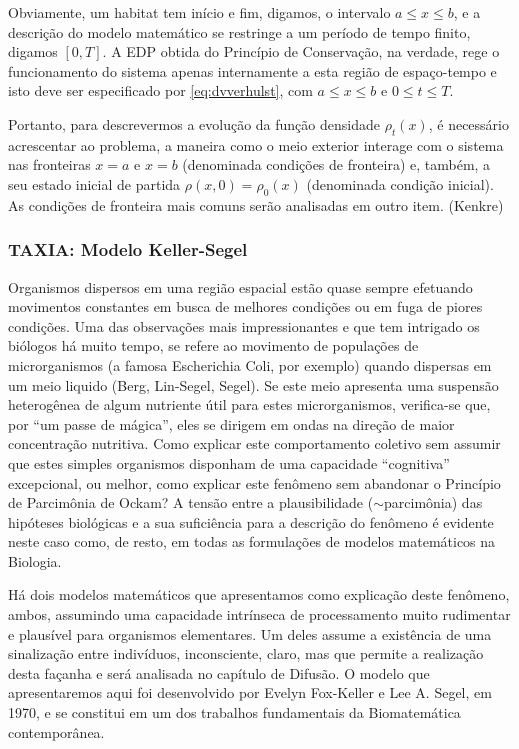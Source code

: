 Obviamente, um habitat tem início e fim, digamos, o intervalo \(a \le x \le b\), e a descrição do modelo matemático se restringe a um período de tempo finito, digamos \([0, T]\). A EDP obtida do Princípio de Conservação, na verdade, rege o funcionamento do sistema apenas internamente a esta região de espaço-tempo e isto deve ser especificado por \eqref{eq:dvverhulst}, com \(a \le x \le b\) e \(0 \le t \le T\).

Portanto, para descrevermos a evolução da função densidade \(\rho_t(x)\), é necessário acrescentar ao problema, a maneira como o meio exterior interage com o sistema nas fronteiras \(x = a\) e \(x = b\) (denominada condições de fronteira) e, também, a seu estado inicial de partida \(\rho(x, 0) = \rho_0(x)\) (denominada condição inicial). As condições de fronteira mais comuns serão analisadas em outro item. (Kenkre)

\subsubsection{TAXIA: Modelo Keller-Segel}

Organismos dispersos em uma região espacial estão quase sempre efetuando movimentos constantes em busca de melhores condições ou em fuga de piores condições. Uma das observações mais impressionantes e que tem intrigado os biólogos há muito tempo, se refere ao movimento de populações de microrganismos (a famosa Escherichia Coli, por exemplo) quando dispersas em um meio liquido (Berg, Lin-Segel, Segel). Se este meio apresenta uma suspensão heterogênea de algum nutriente útil para estes microrganismos, verifica-se que, por ``um passe de mágica'', eles se dirigem em ondas na direção de maior concentração nutritiva. Como explicar este comportamento coletivo sem assumir que estes simples organismos disponham de uma capacidade ``cognitiva'' excepcional, ou melhor, como explicar este fenômeno sem abandonar o Princípio de Parcimônia de Ockam? A tensão entre a plausibilidade (\(\sim\)parcimônia) das hipóteses biológicas e a sua suficiência para a descrição do fenômeno é evidente neste caso como, de resto, em todas as formulações de modelos matemáticos na Biologia.

Há dois modelos matemáticos que apresentamos como explicação deste fenômeno, ambos, assumindo uma capacidade intrínseca de processamento muito rudimentar e plausível para organismos elementares. Um deles assume a existência de uma sinalização entre indivíduos, inconsciente, claro, mas que permite a realização desta façanha e será analisada no capítulo de Difusão. O modelo que apresentaremos aqui foi desenvolvido por Evelyn Fox-Keller e Lee A. Segel, em 1970, e se constitui em um dos trabalhos fundamentais da Biomatemática contemporânea.

